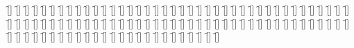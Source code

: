 \begin{questions}
\begin{multicols}{2}
        \question  \f[]
        \question  \f[]
        \question  \f[]
        \question  \f[]
        \question  \f[]
        \question  \f[]
        \question  \f[]
        \question  \f[]
        \question  \f[]
        \question  \f[]
        \question  \f[]
        \question  \f[]
        \question  \f[]
        \question  \f[]
        \question  \f[]
        \question  \f[]
        \question  \f[]
        \question  \f[]
        \question  \f[]
        \question  \f[]
        \question  \f[]
        \question  \f[]
        \question  \f[]
        \question  \f[]
        \question  \f[]
        \question  \f[]
        \question  \f[]
        \question  \f[]
        \question  \f[]
        \question  \f[]
        \question  \f[]
        \question  \f[]
        \question  \f[]
        \question  \f[]
        \question  \f[]
        \question  \f[]
        \question  \f[]
        \question  \f[]
        \question  \f[]
        \question  \f[]
        \question  \f[]
        \question  \f[]
        \question  \f[]
        \question  \f[]
        \question  \f[]
        \question  \f[]
        \question  \f[]
        \question  \f[]
        \question  \f[]
        \question  \f[]
        \question  \f[]
        \question  \f[]
        \question  \f[]
        \question  \f[]
        \question  \f[]
        \question  \f[]
        \question  \f[]
        \question  \f[]
        \question  \f[]
        \question  \f[]
        \question  \f[]
        \question  \f[]
        \question  \f[]
        \question  \f[]
        \question  \f[]
        \question  \f[]
        \question  \f[]
        \question  \f[]
        \question  \f[]
        \question  \f[]
        \question  \f[]
        \question  \f[]
        \question  \f[]
        \question  \f[]
        \question  \f[]
        \question  \f[]
        \question  \f[]
        \question  \f[]
        \question  \f[]
        \question  \f[]
        \question  \f[]
        \question  \f[]
        \question  \f[]
        \question  \f[]
        \question  \f[]
        \question  \f[]
        \question  \f[]
        \question  \f[]
        \question  \f[]
        \question  \f[]
        \question  \f[]
        \question  \f[]
        \question  \f[]
        \question  \f[]
        \question  \f[]
        \question  \f[]
        \question  \f[]
        \question  \f[]
        \question  \f[]
        \question  \f[]
        \question  \f[]
        \question  \f[]
        \question  \f[]
        \question  \f[]
        \question  \f[]
    \end{multicols}
\end{questions}
